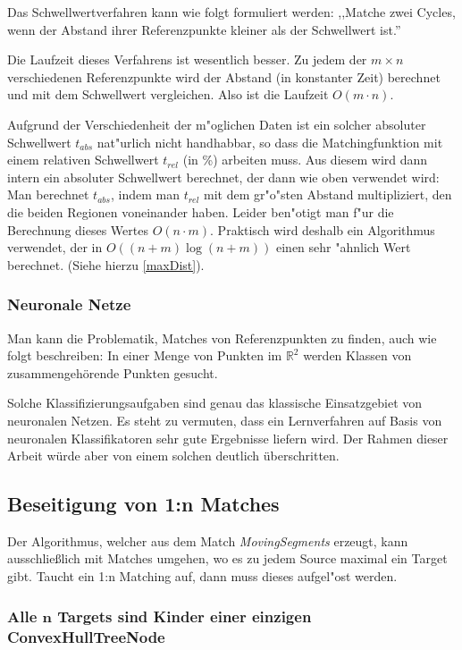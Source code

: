 Das Schwellwertverfahren kann wie folgt formuliert werden: ,,Matche zwei Cycles, wenn der Abstand ihrer Referenzpunkte kleiner als der Schwellwert ist.''

Die Laufzeit dieses Verfahrens ist wesentlich besser. Zu jedem der $m\times n$ verschiedenen  Referenzpunkte wird der  Abstand (in konstanter Zeit) berechnet und mit dem Schwellwert vergleichen. Also ist die Laufzeit $O(m\cdot n)$.

Aufgrund der Verschiedenheit der m"oglichen Daten ist ein solcher absoluter Schwellwert $t_{abs}$ nat"urlich nicht handhabbar, so dass die Matchingfunktion mit einem relativen Schwellwert $t_{rel}$ (in \%) arbeiten muss. Aus diesem wird dann intern ein absoluter Schwellwert berechnet, der dann wie oben verwendet wird: Man berechnet $t_{abs}$, indem man $t_{rel}$ mit dem gr"o"sten Abstand multipliziert, den die beiden Regionen voneinander haben. Leider ben"otigt man f"ur die Berechnung dieses Wertes $O(n\cdot m)$. Praktisch wird deshalb ein Algorithmus verwendet, der in $O((n+m)\log{(n+m)})$ einen sehr "ahnlich Wert berechnet. (Siehe hierzu \vref{maxDist}).

\subsubsection*{Neuronale Netze}

Man kann die Problematik, Matches von Referenzpunkten zu finden, auch wie folgt beschreiben: In einer Menge von Punkten im $\mathbb{R}^2$ werden Klassen von zusammengehörende Punkten gesucht.

Solche Klassifizierungsaufgaben sind genau das klassische Einsatzgebiet von neuronalen Netzen. Es steht zu vermuten, dass ein Lernverfahren auf Basis von neuronalen Klassifikatoren sehr gute Ergebnisse liefern wird. Der Rahmen dieser Arbeit würde aber von einem solchen deutlich überschritten.

\subsection{Beseitigung von 1:n Matches}\label{1zuN}

Der Algorithmus, welcher aus dem Match \textit{MovingSegments} erzeugt, kann ausschließlich mit Matches umgehen, wo es zu jedem Source maximal ein Target gibt. Taucht ein 1:n Matching auf, dann muss dieses aufgel"ost werden. 

\subsubsection*{Alle $\mathbf{n}$ Targets sind Kinder einer einzigen ConvexHullTreeNode}\label{JoinConc}


